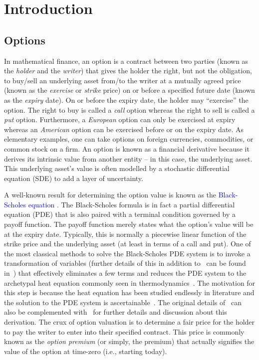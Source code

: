 \chapter{Introduction}
\section{Options}

	In mathematical finance, an option is a contract between two parties (known as the \emph{holder} and the \emph{writer}) that gives the holder the right, but not the obligation, to buy/sell an underlying asset from/to the writer at a mutually agreed price (known as the \emph{exercise} or \emph{strike} price) on or before a specified future date (known as the \emph{expiry} date). On or before the expiry date, the holder may ``exercise'' the option. The right to buy is called a \emph{call} option whereas the right to sell is called a \emph{put} option. Furthermore, a \emph{European} option can only be exercised at expiry whereas an \emph{American} option can be exercised before or on the expiry date. As elementary examples, one can take options on foreign currencies, commodities, or common stock on a firm. An option is known as a financial derivative because it derives its intrinsic value from another entity -- in this case, the underlying asset. This underlying asset's value is often modelled by a stochastic differential equation (SDE) to add a layer of uncertainty. 
	
	A well-known result for determining the option value is known as the \textcolor{blue}{Black-Scholes equation} \cite{Black1973}. The Black-Scholes formula is in fact a partial differential equation (PDE) that is also paired with a terminal condition governed by a payoff function. The payoff function merely states what the option's value will be at the expiry date. Typically, this is normally a piecewise linear function of the strike price and the underlying asset (at least in terms of a call and put). One of the most classical methods to solve the Black-Scholes PDE system is to invoke a transformation of variables (further details of this in addition to~\cite{Black1973} can be found in~\cite{Wilmott1995}) that effectively eliminates a few terms and reduces the PDE system to the archetypal heat equation commonly seen in thermodynamics~\cite{cannon1984one}. The motivation for this step is because the heat equation has been studied endlessly in literature and the solution to the PDE system is ascertainable~\cite{Churchill1938}. The original details of~\cite{Black1973} can also be complemented with~\cite{Wilmott1995} for further details and discussion about this derivation. The crux of option valuation is to determine a fair price for the holder to pay the writer to enter into their specified contract. This price is commonly known as the \emph{option premium} (or simply, the premium) that actually signifies the value of the option at time-zero (i.e., starting today).
	
